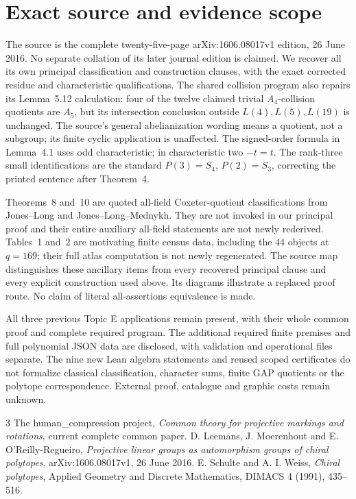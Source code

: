 \documentclass[11pt,a4paper]{article}
\begin{document}
\section{Exact source and evidence scope}
The source is the complete twenty-five-page arXiv:1606.08017v1 edition,
26 June 2016. No separate collation of its later journal edition is
claimed. We recover all its own principal classification and construction
clauses, with the exact corrected residue and characteristic qualifications.
The shared collision program also repairs its Lemma~5.12 calculation:
four of the twelve claimed trivial $A_4$-collision quotients are $A_5$,
but its intersection conclusion outside $L(4),L(5),L(19)$ is unchanged.
The source's general abelianization wording means a quotient, not a
subgroup; its finite cyclic application is unaffected. The signed-order
formula in Lemma~4.1 uses odd characteristic; in characteristic two
$-t=t$. The rank-three small identifications are the standard
$P(3)=S_4$, $P(2)=S_3$, correcting the printed sentence after Theorem~4.

Theorems~8 and~10 are quoted all-field Coxeter-quotient classifications
from Jones--Long and Jones--Long--Mednykh. They are not invoked in our
principal proof and their entire auxiliary all-field statements are not
newly rederived. Tables~1 and~2 are motivating finite census data,
including the $44$ objects at $q=169$; their full atlas computation is
not newly regenerated. The source map distinguishes these ancillary
items from every recovered principal clause and every explicit
construction used above. Its diagrams illustrate a replaced proof route.
No claim of literal all-assertions equivalence is made.

All three previous Topic E applications remain present, with their whole
common proof and complete required program. The additional required
finite premises and full polynomial JSON data are disclosed, with
validation and operational files separate. The nine new Lean algebra
statements and reused scoped certificates do not formalize classical
classification, character sums, finite GAP quotients or the polytope
correspondence. External proof, catalogue and graphic costs remain unknown.

\begin{thebibliography}{3}
 The human\_compression project,
\emph{Common theory for projective markings and rotations}, current complete common paper.
 D. Leemans, J. Moerenhout and E. O'Reilly-Regueiro,
\emph{Projective linear groups as automorphism groups of chiral polytopes},
arXiv:1606.08017v1, 26 June 2016.
 E. Schulte and A. I. Weiss, \emph{Chiral polytopes},
Applied Geometry and Discrete Mathematics, DIMACS 4 (1991), 435--516.
\end{thebibliography}
\end{document}
